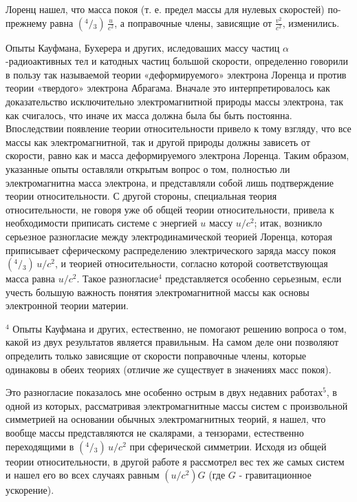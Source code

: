 \documentclass[11pt]{article}
\begin{document}
    Лоренц нашел, что масса покоя (т. е. предел массы для нулевых скоростей)
по-прежнему равна \(\left({}^{4}\big/{}_{3}\right) \, \frac{u}{c^2}\), а
поправочные члены, зависящие от \(\frac{v^2}{c^2}\), изменились.

    Опыты Кауфмана, Бухерера и других, иследоваших массу частиц
\(\alpha\)-радиоактивных тел и катодных частиц большой скорости,
определенно говорили в пользу так называемой теории «деформируемого»
электрона Лоренца и против теории «твердого» электрона Абрагама. Вначале
это интерпретировалось как доказательство исключительно электромагнитной
природы массы электрона, так как счигалось, что иначе их масса должна
была бы быть постоянна. Впоследствии появление теории относительности
привело к тому взгляду, что все массы как электромагнитной, так и другой
природы должны зависеть от скорости, равно как и масса деформируемого
электрона Лоренца. Таким образом, указанные опыты оставляли открытым
вопрос о том, полностью ли электромагнитна масса электрона, и
представляли собой лишь подтверждение теории относительности. С другой
стороны, специальная теория относительности, не говоря уже об общей
теории относительности, привела к необходимости приписать системе с
энергией \(u\) массу \(u/c^2\); итак, возникло серьезное разногласие
между электродинамической теорией Лоренца, которая приписывает
сферическому распределению электрического заряда массу покоя
\(\left({}^{4}\big/{}_{3}\right) \, u/c^2\), и теорией относительности,
согласно которой соответствующая масса равна \(u/c^2\). Такое
разногласие\(^4\) представляется особенно серьезным, если учесть большую
важность понятия электромагнитной массы как основы электронной теории
материи.

    \(^4\) Опыты Кауфмана и других, естественно, не помогают решению вопроса
о том, какой из двух результатов является правильным. На самом деле они
позволяют определить только зависящие от скорости поправочные члены,
которые одинаковы в обеих теориях (отличие же существует в значениях
масс покоя).

    Это разногласие показалось мне особенно острым в двух недавних
работах\(^5\), в одной из которых, рассматривая электромагнитные массы
систем с произвольной симметрией на основании обычных электромагнитных
теорий, я нашел, что вообще массы представляются не скалярами, а
тензорами, естественно переходящими в
\(\left({}^{4} \big /{}_{3}\right) \, u/c^2\) при сферической симметрии.
Исходя из общей теории относительности, в другой работе я рассмотрел вес
тех же самых систем и нашел его во всех случаях равным
\(\left(u/c^2\right)G\) (где \(G\) - гравитационное ускорение).
\end{document}
